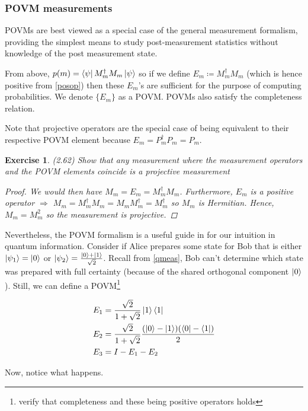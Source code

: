 \documentclass[11pt]{article}
\newcommand\0{\mathbf{0}}
\newcommand\<{\langle}
\renewcommand\>{\rangle}
\renewcommand\implies{\Rightarrow}
\newtheorem{exercise}[theorem]{Exercise}
\begin{document}
\subsubsection{POVM measurements}\label{povm}

POVMs are best viewed as a special case of the general measurement formalism, providing the simplest means to study post-measurement statistics without knowledge of the post measurement state.

From above, $p(m) = \bra{\psi} M_m^\dagger M_m \ket{\psi}$ so if we define $E_m \coloneqq M_m^\dagger M_m$ (which is hence positive from \ref{posop}) then these $E_m$'s are sufficient for the purpose of computing probabilities. We denote $\{ E_m \}$ as a POVM. POVMs also satisfy the completeness relation.

Note that projective operators are the special case of being equivalent to their respective POVM element because $E_m = P_m^\dag P_m = P_m$. 

\begin{exercise}
(2.62) Show that any measurement where the measurement operators and the POVM elements coincide is a projective measurement

\begin{proof}
We would then have $M_m = E_m = M_m^\dag M_m$. Furthermore, $E_m$ is a positive operator $\implies$ $M_m = M_m^\dag M_m = M_m M_m^\dag = M_m^\dag$ so $M_m$ is Hermitian. Hence, $M_m = M_m^2$ so the measurement is projective.
\end{proof}	
\end{exercise}

Nevertheless, the POVM formalism is a useful guide in for our intuition in quantum information. Consider if Alice prepares some state for Bob that is either $\ket{\psi_1} = \ket{0}$ or $\ket{\psi_2} = \frac{\ket{0} + \ket{1}}{\sqrt{2}}$. Recall from \ref{qmeas}, Bob can't determine which state was prepared with full certainty (because of the shared orthogonal component $\ket{0}$). Still, we can define a POVM\footnote{verify that completeness and these being positive operators holds}

\begin{align*}
E_1 &= \frac{\sqrt{2}}{1+\sqrt{2}}\ket{1}\bra{1}	\\
E_2 &= \frac{\sqrt{2}}{1+\sqrt{2}}\frac{(\ket{0} - \ket{1})(\bra{0} - \bra{1})}{2} \\
E_3 &= I - E_1 - E_2
\end{align*}

Now, notice what happens. 
\end{document}
